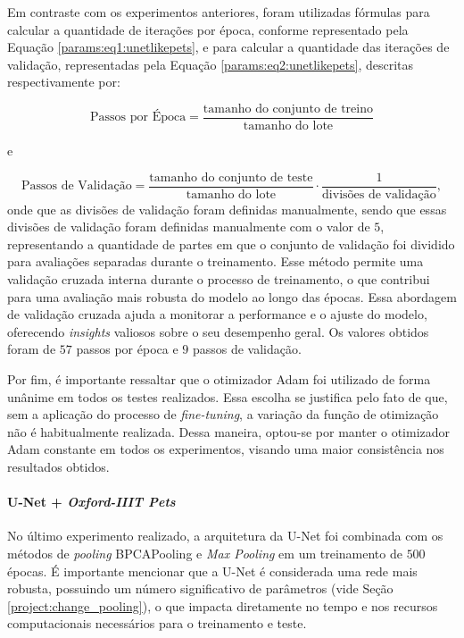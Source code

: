 Em contraste com os experimentos anteriores, foram utilizadas fórmulas para calcular a quantidade de iterações por época, conforme representado pela Equação \ref{params:eq1:unetlikepets}, e para calcular a quantidade das iterações de validação, representadas pela Equação \ref{params:eq2:unetlikepets}, descritas respectivamente por:

\begin{equation}
    \label{params:eq1:unetlikepets}
    \text{Passos por Época} = \frac{\text{tamanho do conjunto de treino}}{\text{tamanho do lote}}
\end{equation}

e

\begin{equation}
    \label{params:eq2:unetlikepets}
    \text{Passos de Validação} = \frac{\text{tamanho do conjunto de teste}}{\text{tamanho do lote}} \cdot \frac{1}{\text{divisões de validação}},
\end{equation}
onde que as divisões de validação foram definidas manualmente, sendo que essas divisões de validação foram definidas manualmente com o valor de $5$, representando a quantidade de partes em que o conjunto de validação foi dividido para avaliações separadas durante o treinamento. Esse método permite uma validação cruzada interna durante o processo de treinamento, o que contribui para uma avaliação mais robusta do modelo ao longo das épocas. Essa abordagem de validação cruzada ajuda a monitorar a performance e o ajuste do modelo, oferecendo\textit{ insights }valiosos sobre o seu desempenho geral. Os valores obtidos foram de $57$ passos por época e $9$ passos de validação.

Por fim, é importante ressaltar que o otimizador Adam foi utilizado de forma unânime em todos os testes realizados. Essa escolha se justifica pelo fato de que, sem a aplicação do processo de \textit{fine-tuning}, a variação da função de otimização não é habitualmente realizada. Dessa maneira, optou-se por manter o otimizador Adam constante em todos os experimentos, visando uma maior consistência nos resultados obtidos.


\paragraph{U-Net + \textit{Oxford-IIIT Pets}}
\label{params:unetpets}
No último experimento realizado, a arquitetura da U-Net foi combinada com os métodos de \textit{pooling} BPCAPooling e \textit{Max Pooling} em um treinamento de $500$ épocas. É importante mencionar que a U-Net é considerada uma rede mais robusta, possuindo um número significativo de parâmetros (vide Seção \ref{project:change_pooling}), o que impacta diretamente no tempo e nos recursos computacionais necessários para o treinamento e teste.

